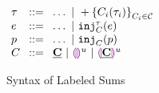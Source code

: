 
\begin{figure}[ht]
  $\arraycolsep=4pt\begin{array}{lll}
      \tau & ::= & \ldots ~\vert~ \tlabeledsum{C_i(\tau_i)}_{C_i \in \C} \\
      e    & ::= & \ldots ~\vert~ \hinj{C}{\tau}{e}                            \\
      p    & ::= & \ldots ~\vert~ \hinjp{C}{p}                       \\
      C    & ::= & \tagC ~\vert~ \tagehole{u} ~\vert~ \taghole{\tagC}{u}
    \end{array}$
  \caption{Syntax of Labeled Sums}
  \label{fig:labeled-sums-syntax}
\end{figure}

